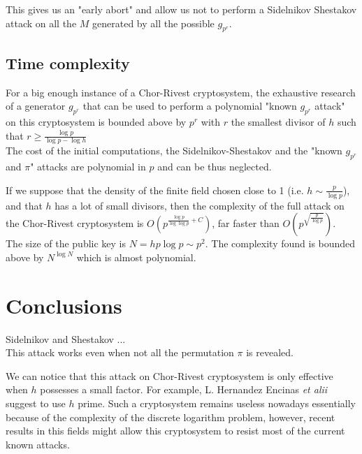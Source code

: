 \documentclass[a4paper]{article}
\begin{document}
This gives us an "early abort" and allow us not to perform a Sidelnikov Shestakov attack on all the $M$ generated by all the possible $g_{p^r}$.

\subsection{Time complexity}

For a big enough instance of a Chor-Rivest cryptosystem, the exhaustive research of a generator $g_{p^r}$ that can be used to perform a polynomial "known $g_{p^r}$ attack" on this cryptosystem is bounded above by $p^r$ with $r$ the smallest divisor of $h$ such that $r \geq \frac{\log p}{\log p - \log h}$\\

The cost of the initial computations, the Sidelnikov-Shestakov and the "known $g_{p^r}$ and $\pi$" attacks are polynomial in $p$ and can be thus neglected.

If we suppose that the density of the finite field chosen close to 1 (i.e. $h \sim \frac{p}{\log p}$), and that $h$ has a lot of small divisors, then the complexity of the full attack on the Chor-Rivest cryptosystem is $O\left( p^{\frac{\log p}{\log \log p} + C} \right)$, far faster than $O\left(p^{\sqrt{\frac{p}{\log p}}}\right)$.\\

The size of the public key is $N = hp\log p \sim p^2$. The complexity found is bounded above by $N^{\log N}$ which is almost polynomial.





\section{Conclusions}

Sidelnikov and Shestakov ... \\



This attack works even when not all the permutation $\pi$ is revealed.

We can notice that this attack on Chor-Rivest cryptosystem is only effective when $h$ possesses a small factor. For example, L. Hernandez Encinas \textit{et alii} \cite{Enc04} suggest to use $h$ prime. Such a cryptosystem remains useless nowadays essentially because of the complexity of the discrete logarithm problem, however, recent results in this fields might allow this cryptosystem to resist most of the current known attacks.
\end{document}
